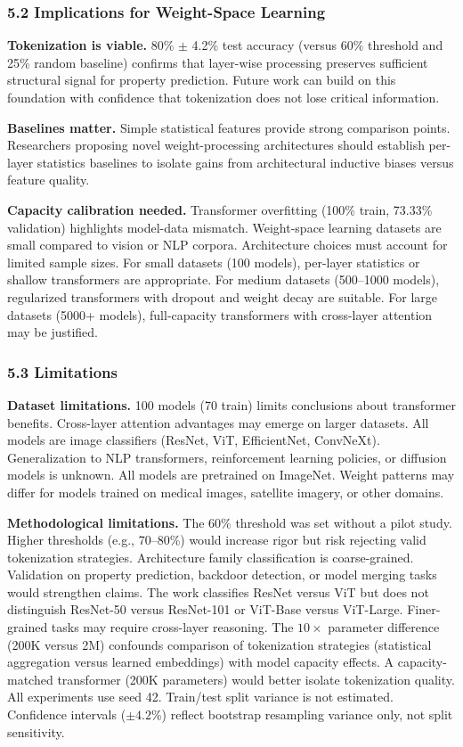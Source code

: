 \subsubsection{5.2 Implications for Weight-Space Learning}

\textbf{Tokenization is viable.} 80\% $\pm$ 4.2\% test accuracy (versus 60\% threshold and 25\% random baseline) confirms that layer-wise processing preserves sufficient structural signal for property prediction. Future work can build on this foundation with confidence that tokenization does not lose critical information.

\textbf{Baselines matter.} Simple statistical features provide strong comparison points. Researchers proposing novel weight-processing architectures should establish per-layer statistics baselines to isolate gains from architectural inductive biases versus feature quality.

\textbf{Capacity calibration needed.} Transformer overfitting (100\% train, 73.33\% validation) highlights model-data mismatch. Weight-space learning datasets are small compared to vision or NLP corpora. Architecture choices must account for limited sample sizes. For small datasets (100 models), per-layer statistics or shallow transformers are appropriate. For medium datasets (500--1000 models), regularized transformers with dropout and weight decay are suitable. For large datasets (5000+ models), full-capacity transformers with cross-layer attention may be justified.

\subsubsection{5.3 Limitations}

\textbf{Dataset limitations.} 100 models (70 train) limits conclusions about transformer benefits. Cross-layer attention advantages may emerge on larger datasets. All models are image classifiers (ResNet, ViT, EfficientNet, ConvNeXt). Generalization to NLP transformers, reinforcement learning policies, or diffusion models is unknown. All models are pretrained on ImageNet. Weight patterns may differ for models trained on medical images, satellite imagery, or other domains.

\textbf{Methodological limitations.} The 60\% threshold was set without a pilot study. Higher thresholds (e.g., 70--80\%) would increase rigor but risk rejecting valid tokenization strategies. Architecture family classification is coarse-grained. Validation on property prediction, backdoor detection, or model merging tasks would strengthen claims. The work classifies ResNet versus ViT but does not distinguish ResNet-50 versus ResNet-101 or ViT-Base versus ViT-Large. Finer-grained tasks may require cross-layer reasoning. The $10\times$ parameter difference (200K versus 2M) confounds comparison of tokenization strategies (statistical aggregation versus learned embeddings) with model capacity effects. A capacity-matched transformer (200K parameters) would better isolate tokenization quality. All experiments use seed 42. Train/test split variance is not estimated. Confidence intervals ($\pm 4.2$\%) reflect bootstrap resampling variance only, not split sensitivity.

